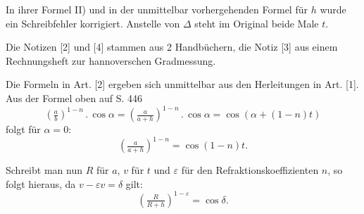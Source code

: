 In ihrer Formel II) und in der unmittelbar vorhergehenden Formel für \(h\)
wurde ein Schreibfehler korrigiert. Anstelle von \(\Delta\) steht im Original beide Male \(t\).
\par\noindent\hspace*{\parindent}Die Notizen [2] und [4] stammen aus 2 Handbüchern, die Notiz [3] aus einem
Rechnungsheft zur hannoverschen Gradmessung.
\par\noindent\hspace*{\parindent}Die Formeln in Art. [2] ergeben sich unmittelbar aus den Herleitungen
in Art. [1]. Aus der Formel oben auf S. 446
\[
\left(\tfrac ab\right)^{1-n}\mathbin{.}\cos\alpha
=\left(\tfrac{a}{a+h}\right)^{1-n}\mathbin{.}\cos\alpha
=\cos(\alpha+(1-n)t)
\]
\noindent folgt für \(\alpha=0\):
\[
\left(\tfrac{a}{a+h}\right)^{1-n}=\cos(1-n)t.
\]
\par\noindent\hspace*{\parindent}Schreibt man nun \(R\) für \(a\), \(v\) für \(t\) und
\(\varepsilon\) für den Refraktionskoeffizienten \(n\), so folgt hieraus,
da \(v-\varepsilon v=\delta\) gilt:
\[
\left(\tfrac{R}{R+h}\right)^{1-\varepsilon}=\cos\delta.
\]
\endgroup

